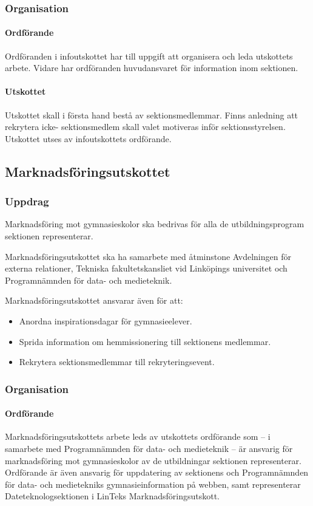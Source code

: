 \documentclass{datateknologsektionen-document}
\begin{document}
\subsubsection{Organisation}
\paragraph{Ordförande}
Ordföranden i infoutskottet har till uppgift att organisera och leda utskottets arbete. Vidare har ordföranden huvudansvaret för information inom sektionen.

\paragraph{Utskottet}
Utskottet skall i första hand bestå av sektionsmedlemmar. Finns anledning att rekrytera icke- sektionsmedlem skall valet motiveras inför sektionsstyrelsen. Utskottet utses av infoutskottets ordförande.

\subsection{Marknadsföringsutskottet}
\label{mafu}
\subsubsection{Uppdrag}
Marknadsföring mot gymnasieskolor ska bedrivas för alla de utbildningsprogram
sektionen representerar.

Marknadsföringsutskottet ska ha samarbete med åtminstone Avdelningen för externa relationer,
Tekniska fakultetskansliet vid Linköpings universitet och Programnämnden för data- och
medieteknik.

Marknadsföringsutskottet ansvarar även för att:
\begin{itemize}
  \item Anordna inspirationsdagar för gymnasieelever.
  \item Sprida information om hemmissionering till sektionens medlemmar.
  \item Rekrytera sektionsmedlemmar till rekryteringsevent.
\end{itemize}
\subsubsection{Organisation}
\paragraph{Ordförande}
Marknadsföringsutskottets arbete leds av utskottets ordförande som – i samarbete med
Programnämnden för data- och medieteknik – är ansvarig för marknadsföring mot
gymnasieskolor av de utbildningar sektionen representerar. Ordförande är även
ansvarig för uppdatering av sektionens och Programnämnden för data- och medietekniks
gymnasieinformation på webben, samt representerar Dateteknologsektionen i LinTeks Marknadsföringsutskott.
\end{document}
